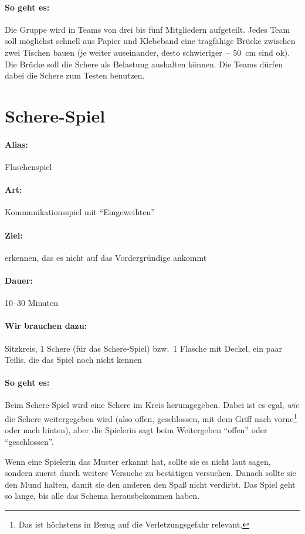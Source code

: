 \paragraph{So geht es:} Die Gruppe wird in Teams von drei bis fünf Mitgliedern aufgeteilt. Jedes Team soll möglichst schnell aus Papier und Klebeband eine tragfähige Brücke zwischen zwei Tischen bauen (je weiter auseinander, desto schwieriger~-- 50~cm sind ok). Die Brücke soll die Schere als Belastung aushalten können. Die Teams dürfen dabei die Schere zum Testen benutzen.

\section{Schere-Spiel}
\label{flaschenspiel}
\paragraph{Alias:} Flaschenspiel
\paragraph{Art:} Kommunikationsspiel mit "`Eingeweihten"'
\paragraph{Ziel:} erkennen, das es nicht auf das Vordergründige ankommt
\paragraph{Dauer:} 10--30 Minuten
\paragraph{Wir brauchen dazu:} Sitzkreis, 1 Schere (für das Schere-Spiel) bzw.~1 Flasche mit Deckel, ein paar Teilis, die das Spiel noch nicht kennen
\paragraph{So geht es:} Beim Schere-Spiel wird eine Schere im Kreis herumgegeben. Dabei ist es egal, \emph{wie} die Schere weitergegeben wird (also offen, geschlossen, mit dem Griff nach vorne\footnote{Das ist höchstens in Bezug auf die Verletzungsgefahr relevant.} oder nach hinten), aber die Spielerin sagt beim Weitergeben "`offen"' oder "`geschlossen"'.

Wenn eine Spielerin das Muster erkannt hat, sollte sie es nicht laut sagen, sondern zuerst durch weitere Versuche zu bestätigen versuchen. Danach sollte sie den Mund halten, damit sie den anderen den Spaß nicht verdirbt. Das Spiel geht so lange, bis alle das Schema herausbekommen haben.

